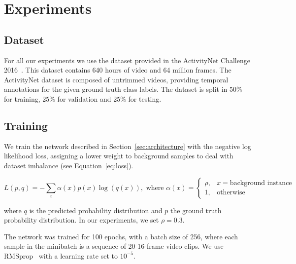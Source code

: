 \documentclass{article}
\begin{document}

\section{Experiments}

\subsection{Dataset}
For all our experiments we use the dataset provided in the ActivityNet Challenge 2016~\cite{caba2015activitynet}. This dataset contains 640 hours of video and 64 million frames. The ActivityNet dataset is composed of untrimmed videos, providing temporal annotations for the given ground truth class labels. The dataset is split in 50\% for training, 25\% for validation and 25\% for testing.

\subsection{Training}
We train the network described in Section~\ref{sec:architecture} with the negative log likelihood loss, assigning a lower weight to background samples to deal with dataset imbalance (see Equation~\ref{eq:loss}).

\begin{equation}
    L(p,q) = - \sum_x \alpha(x) p(x) \log (q(x)), \text{ where } \alpha(x) =
    \begin{cases}
        \rho, & x = \text{background instance}\\
        1,    & \text{otherwise}
    \end{cases}
    \label{eq:loss}
\end{equation}

where $q$ is the predicted probability distribution and $p$ the ground truth probability distribution. In our experiments, we set $\rho = 0.3$.

The network was trained for 100 epochs, with a batch size of 256, where each sample in the minibatch is a sequence of 20 16-frame video clips. We use RMSprop~\cite{dauphin2015rmsprop} with a learning rate set to $10^{-5}$.

\end{document}
